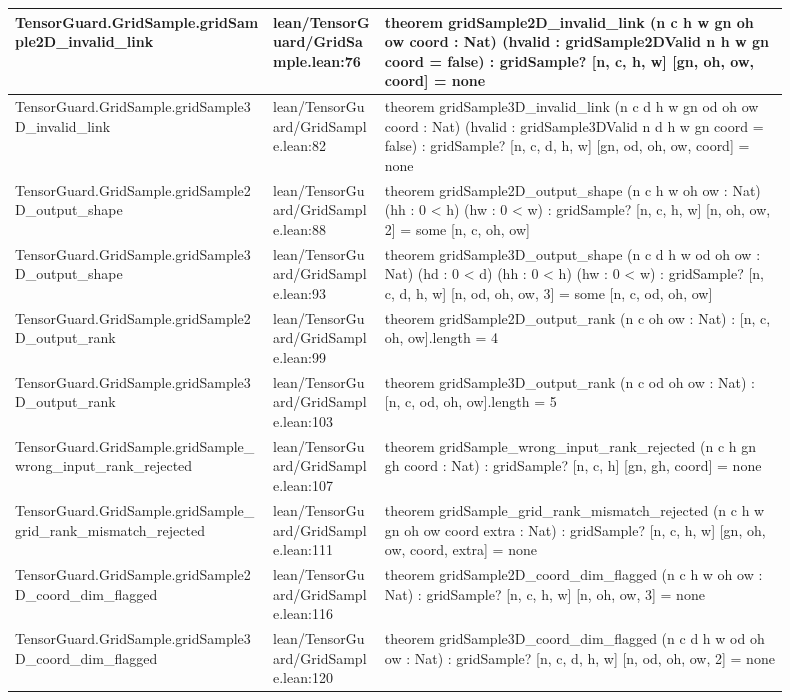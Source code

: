 \documentclass[10pt]{article}
\begin{document}
\begin{longtable}{|p{0.30\linewidth}|p{0.13\linewidth}|p{0.47\linewidth}|}
\hline
TensorGuard.GridSample.gridSample2D\_invalid\_link & lean/TensorGuard/GridSample.lean:76 & theorem gridSample2D\_invalid\_link (n c h w gn oh ow coord : Nat) (hvalid : gridSample2DValid n h w gn coord = false) : gridSample? [n, c, h, w] [gn, oh, ow, coord] = none \\
\hline
TensorGuard.GridSample.gridSample3D\_invalid\_link & lean/TensorGuard/GridSample.lean:82 & theorem gridSample3D\_invalid\_link (n c d h w gn od oh ow coord : Nat) (hvalid : gridSample3DValid n d h w gn coord = false) : gridSample? [n, c, d, h, w] [gn, od, oh, ow, coord] = none \\
\hline
TensorGuard.GridSample.gridSample2D\_output\_shape & lean/TensorGuard/GridSample.lean:88 & theorem gridSample2D\_output\_shape (n c h w oh ow : Nat) (hh : 0 < h) (hw : 0 < w) : gridSample? [n, c, h, w] [n, oh, ow, 2] = some [n, c, oh, ow] \\
\hline
TensorGuard.GridSample.gridSample3D\_output\_shape & lean/TensorGuard/GridSample.lean:93 & theorem gridSample3D\_output\_shape (n c d h w od oh ow : Nat) (hd : 0 < d) (hh : 0 < h) (hw : 0 < w) : gridSample? [n, c, d, h, w] [n, od, oh, ow, 3] = some [n, c, od, oh, ow] \\
\hline
TensorGuard.GridSample.gridSample2D\_output\_rank & lean/TensorGuard/GridSample.lean:99 & theorem gridSample2D\_output\_rank (n c oh ow : Nat) : [n, c, oh, ow].length = 4 \\
\hline
TensorGuard.GridSample.gridSample3D\_output\_rank & lean/TensorGuard/GridSample.lean:103 & theorem gridSample3D\_output\_rank (n c od oh ow : Nat) : [n, c, od, oh, ow].length = 5 \\
\hline
TensorGuard.GridSample.gridSample\_wrong\_input\_rank\_rejected & lean/TensorGuard/GridSample.lean:107 & theorem gridSample\_wrong\_input\_rank\_rejected (n c h gn gh coord : Nat) : gridSample? [n, c, h] [gn, gh, coord] = none \\
\hline
TensorGuard.GridSample.gridSample\_grid\_rank\_mismatch\_rejected & lean/TensorGuard/GridSample.lean:111 & theorem gridSample\_grid\_rank\_mismatch\_rejected (n c h w gn oh ow coord extra : Nat) : gridSample? [n, c, h, w] [gn, oh, ow, coord, extra] = none \\
\hline
TensorGuard.GridSample.gridSample2D\_coord\_dim\_flagged & lean/TensorGuard/GridSample.lean:116 & theorem gridSample2D\_coord\_dim\_flagged (n c h w oh ow : Nat) : gridSample? [n, c, h, w] [n, oh, ow, 3] = none \\
\hline
TensorGuard.GridSample.gridSample3D\_coord\_dim\_flagged & lean/TensorGuard/GridSample.lean:120 & theorem gridSample3D\_coord\_dim\_flagged (n c d h w od oh ow : Nat) : gridSample? [n, c, d, h, w] [n, od, oh, ow, 2] = none \\

\end{longtable}
\end{document}
